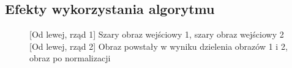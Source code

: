 \documentclass[a4paper,12pt, titlepage]{report}
\begin{document}
\subsection*{Efekty wykorzystania algorytmu}
\begin{figure}[h]
    \centering
    \qquad
    \caption{[Od lewej, rząd 1] Szary obraz wejściowy 1, szary obraz wejściowy 2 [Od lewej, rząd 2] Obraz powstały w wyniku dzielenia obrazów 1 i 2, obraz po normalizacji}%
    \label{fig:rysunek}%
\end{figure}
\end{document}
